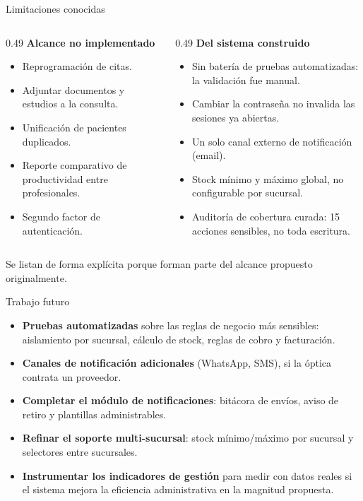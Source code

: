 \documentclass[11pt,aspectratio=169]{beamer}
\begin{document}
\begin{frame}{Limitaciones conocidas}
  \begin{columns}[T,onlytextwidth]
    \begin{column}{0.49\textwidth}
      {\color{sigaAzul}\textbf{Alcance no implementado}}
      \begin{itemize}\small
        \item Reprogramación de citas.
        \item Adjuntar documentos y estudios a la consulta.
        \item Unificación de pacientes duplicados.
        \item Reporte comparativo de productividad entre profesionales.
        \item Segundo factor de autenticación.
      \end{itemize}
    \end{column}
    \begin{column}{0.49\textwidth}
      {\color{sigaAzul}\textbf{Del sistema construido}}
      \begin{itemize}\small
        \item Sin batería de pruebas automatizadas: la validación fue manual.
        \item Cambiar la contraseña no invalida las sesiones ya abiertas.
        \item Un solo canal externo de notificación (email).
        \item Stock mínimo y máximo global, no configurable por sucursal.
        \item Auditoría de cobertura curada: 15 acciones sensibles, no toda escritura.
      \end{itemize}
    \end{column}
  \end{columns}

  \vspace{6pt}
  {\small Se listan de forma explícita porque forman parte del alcance propuesto
  originalmente.}
\end{frame}

\begin{frame}{Trabajo futuro}
  \begin{itemize}
    \item \textbf{Pruebas automatizadas} sobre las reglas de negocio más sensibles:
      aislamiento por sucursal, cálculo de stock, reglas de cobro y facturación.
    \item \textbf{Canales de notificación adicionales} (WhatsApp, SMS), si la óptica
      contrata un proveedor.
    \item \textbf{Completar el módulo de notificaciones}: bitácora de envíos, aviso de
      retiro y plantillas administrables.
    \item \textbf{Refinar el soporte multi-sucursal}: stock mínimo/máximo por sucursal
      y selectores entre sucursales.
    \item \textbf{Instrumentar los indicadores de gestión} para medir con datos reales
      si el sistema mejora la eficiencia administrativa en la magnitud propuesta.
  \end{itemize}
\end{frame}
\end{document}
